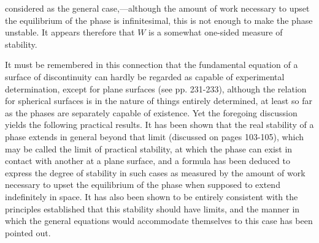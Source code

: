 \documentclass[12pt]{article}
\begin{document}
{considered as the general case,---although the amount of work necessary to upset the equilibrium of the phase is infinitesimal, this is not enough to make the phase unstable. It appears therefore that $W$ is a somewhat one-sided measure of stability.

It must be remembered in this connection that the fundamental equation of a surface of discontinuity can hardly be regarded as capable of experimental determination, except for plane surfaces (see pp. 231-233), although the relation for spherical surfaces is in the nature of things entirely determined, at least so far as the phases are separately capable of existence. Yet the foregoing discussion yields the following practical results. It has been shown that the real stability of a phase extends in general beyond that limit (discussed on pages 103-105), which may be called the limit of practical stability, at which the phase can exist in contact with another at a plane surface, and a formula has been deduced to express the degree of stability in such cases as measured by the amount of work necessary to upset the equilibrium of the phase when supposed to extend indefinitely in space. It has also been shown to be entirely consistent with the principles established that this stability should have limits, and the manner in which the general equations would accommodate themselves to this case has been pointed out.

}
\end{document}
